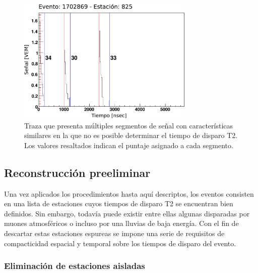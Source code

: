 		\begin{figure}[ht]
			\begin{center}
			\includegraphics[width=0.75\textwidth]{fig/seleccionAuger/multipicos.pdf}
			\caption{Traza que presenta múltiples segmentos de señal con características similares en la que no es posible determinar el tiempo de disparo T2. Los valores resaltados indican el puntaje asignado a cada segmento.}
			\label{fig:multipicos}
			\end{center}
		\end{figure}
		
		
	\subsection{Reconstrucción preeliminar}
	
	Una vez aplicados los procedimientos hasta aquí descriptos, los eventos consisten en una lista de estaciones cuyos tiempos de disparo T2 se encuentran bien definidos.
	Sin embargo, todav\'ia puede existir entre ellas algunas disparadas por muones atmosféricos o incluso por una lluvias de baja energía.
	Con el fin de descartar estas estaciones espureas se impone una serie de requisitos de compacticidad espacial y temporal sobre los tiempos de disparo del evento.
	
	\subsubsection{Eliminación de estaciones aisladas} 
	
